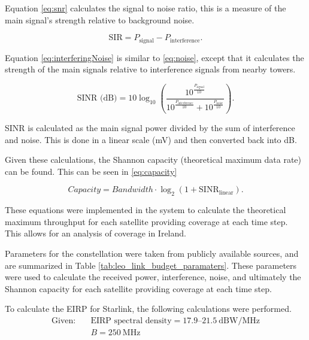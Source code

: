 Equation \ref{eq:snr} \cite{CEPTdoc1417}calculates the signal to noise ratio, this is  a measure of the main signal's strength relative to background noise. 

\begin{equation}
\text{SIR} = P_{\text{signal}} - P_{\text{interference}}.
\label{eq:interferingNoise}
\end{equation}

Equation \ref{eq:interferingNoise} \cite{CEPTdoc1417} is similar to \ref{eq:noise}, except that it calculates the strength of the main signals relative to interference signals from nearby towers. 


\begin{equation}
\text{SINR (dB)} = 10 \log_{10} \left( \frac{10^{\frac{P_{\text{signal}}}{10}}}{10^{\frac{P_{\text{interference}}}{10}} + 10^{\frac{P_{\text{noise}}}{10}}} \right).
\label{eq:sinr}
\end{equation}

SINR is calculated as the main signal power divided by the sum of interference and noise. This is done in a linear scale (mV) and then converted back into dB. 

Given these calculations, the Shannon capacity (theoretical maximum data rate) can be found. This can be seen in \ref{eq:capacity} \cite{goncharenko2023optimization}

\begin{equation}
Capacity = Bandwidth \cdot \log_2 \left( 1 + \text{SINR}_{\text{linear}} \right).
\label{eq:capacity}
\end{equation}

These equations were implemented in the system to calculate the theoretical maximum throughput for each satellite providing coverage at each time step. This allows for an analysis of coverage in Ireland. 

Parameters for the constellation were taken from publicly available sources, and are summarized in Table \ref{tab:leo_link_budget_paramaters}. These parameters were used to calculate the received power, interference, noise, and ultimately the Shannon capacity for each satellite providing coverage at each time step.

To calculate the EIRP for Starlink, the following calculations were performed. 
\[
\begin{aligned}
\text{Given:}\quad 
& \text{EIRP spectral density} = 17.9\text{--}21.5 \ \mathrm{dBW/MHz} \\
& B = 250 \ \mathrm{MHz}
\end{aligned}
\]


